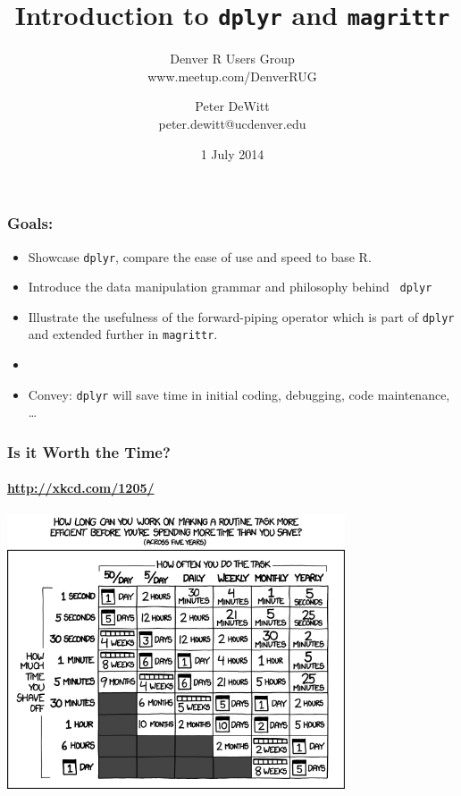 \documentclass{beamer}\usepackage[]{graphicx}\usepackage[]{color}
\author{Peter DeWitt\\peter.dewitt@ucdenver.edu}
\date{1 July 2014}
\title{Introduction to {\tt dplyr} and {\tt magrittr}}
\subtitle{Denver R Users Group\\www.meetup.com/DenverRUG}
\begin{document}
\begin{frame}[fragile]
  \maketitle
\end{frame} 

\begin{frame}[fragile]
  \frametitle{Goals:}

  \begin{itemize}
    \item Showcase {\tt dplyr}, compare the ease of use and speed to base R.
    \item Introduce the data manipulation grammar and philosophy behind {\tt
      dplyr}
    \item Illustrate the usefulness of the forward-piping operator which is
      part of {\tt dplyr} and extended further in {\tt magrittr}.  

    \item[]

    \item Convey: {\tt dplyr} will save time in initial coding, debugging, code
      maintenance, \ldots
  \end{itemize}


\end{frame} 

\begin{frame}[fragile]
  \frametitle{Is it Worth the Time?}
  \framesubtitle{\url{http://xkcd.com/1205/}}

  \begin{center}
    \includegraphics[width=0.75\textwidth]{../figure/is_it_worth_the_time} 
  \end{center}
\end{frame} 
\end{document}
